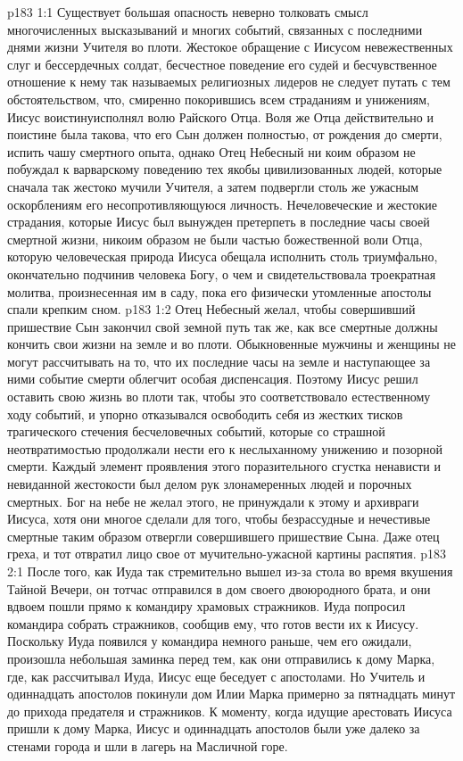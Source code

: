 \vs p183 1:1 Существует большая опасность неверно толковать смысл многочисленных высказываний и многих событий, связанных с последними днями жизни Учителя во плоти. Жестокое обращение с Иисусом невежественных слуг и бессердечных солдат, бесчестное поведение его судей и бесчувственное отношение к нему так называемых религиозных лидеров не следует путать с тем обстоятельством, что, смиренно покорившись всем страданиям и унижениям, Иисус воистинуисполнял волю Райского Отца. Воля же Отца действительно и поистине была такова, что его Сын должен полностью, от рождения до смерти, испить чашу смертного опыта, однако Отец Небесный ни коим образом не побуждал к варварскому поведению тех якобы цивилизованных людей, которые сначала так жестоко мучили Учителя, а затем подвергли столь же ужасным оскорблениям его несопротивляющуюся личность. Нечеловеческие и жестокие страдания, которые Иисус был вынужден претерпеть в последние часы своей смертной жизни, никоим образом не были частью божественной воли Отца, которую человеческая природа Иисуса обещала исполнить столь триумфально, окончательно подчинив человека Богу, о чем и свидетельствовала троекратная молитва, произнесенная им в саду, пока его физически утомленные апостолы спали крепким сном.
\vs p183 1:2 Отец Небесный желал, чтобы совершивший пришествие Сын закончил свой земной путь  так же, как все смертные должны кончить свои жизни на земле и во плоти. Обыкновенные мужчины и женщины не могут рассчитывать на то, что их последние часы на земле и наступающее за ними событие смерти облегчит особая диспенсация. Поэтому Иисус решил оставить свою жизнь во плоти так, чтобы это соответствовало естественному ходу событий, и упорно отказывался освободить себя из жестких тисков трагического стечения бесчеловечных событий, которые со страшной неотвратимостью продолжали нести его к неслыханному унижению и позорной смерти. Каждый элемент проявления этого поразительного сгустка ненависти и невиданной жестокости был делом рук злонамеренных людей и порочных смертных. Бог на небе не желал этого, не принуждали к этому и архивраги Иисуса, хотя они многое сделали для того, чтобы безрассудные и нечестивые смертные таким образом отвергли совершившего пришествие Сына. Даже отец греха, и тот отвратил лицо свое от мучительно\hyp{}ужасной картины распятия.
\vs p183 2:1 После того, как Иуда так стремительно вышел из\hyp{}за стола во время вкушения Тайной Вечери, он тотчас отправился в дом своего двоюродного брата, и они вдвоем пошли прямо к командиру храмовых стражников. Иуда попросил командира собрать стражников, сообщив ему, что готов вести их к Иисусу. Поскольку Иуда появился у командира немного раньше, чем его ожидали, произошла небольшая заминка перед тем, как они отправились к дому Марка, где, как рассчитывал Иуда, Иисус еще беседует с апостолами. Но Учитель и одиннадцать апостолов покинули дом Илии Марка примерно за пятнадцать минут до прихода предателя и стражников. К моменту, когда идущие арестовать Иисуса пришли к дому Марка, Иисус и одиннадцать апостолов были уже далеко за стенами города и шли в лагерь на Масличной горе.
